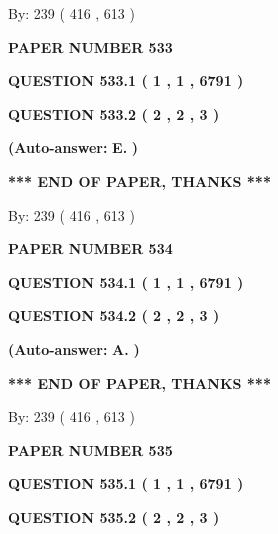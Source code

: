 \documentclass[12pt]{article}
\begin{document}
   
\hspace{1.0in} By: 
 239 ( 416 ,  613 )
   
   
   
   
\newpage 
\setcounter{page}{ 
   533001 } 
   
   
 {\textbf{ \Large{ PAPER NUMBER  533  }}}
   
   
   
   
  
  
{\textbf{\large{QUESTION
533.1 
 ( 1 , 1 , 6791 )
}}}
  
  
{\textbf{\large{QUESTION
533.2 
 ( 2 , 2 , 3 )
}}}
 
 
{\textbf{(Auto-answer:}}
{\textbf{\large{
E.}}}
{\textbf{)}}
 
 
   
   
   
   
\vspace{1.0in} 
{\textbf{\large{ *** END OF PAPER, THANKS *** }}} 
   
   
\hspace{1.0in} By: 
 239 ( 416 ,  613 )
   
   
   
   
\newpage 
\setcounter{page}{ 
   534001 } 
   
   
 {\textbf{ \Large{ PAPER NUMBER  534  }}}
   
   
   
   
  
  
{\textbf{\large{QUESTION
534.1 
 ( 1 , 1 , 6791 )
}}}
  
  
{\textbf{\large{QUESTION
534.2 
 ( 2 , 2 , 3 )
}}}
 
 
{\textbf{(Auto-answer:}}
{\textbf{\large{
A.}}}
{\textbf{)}}
 
 
   
   
   
   
\vspace{1.0in} 
{\textbf{\large{ *** END OF PAPER, THANKS *** }}} 
   
   
\hspace{1.0in} By: 
 239 ( 416 ,  613 )
   
   
   
   
\newpage 
\setcounter{page}{ 
   535001 } 
   
   
 {\textbf{ \Large{ PAPER NUMBER  535  }}}
   
   
   
   
  
  
{\textbf{\large{QUESTION
535.1 
 ( 1 , 1 , 6791 )
}}}
  
  
{\textbf{\large{QUESTION
535.2 
 ( 2 , 2 , 3 )
}}}
 
\end{document}

